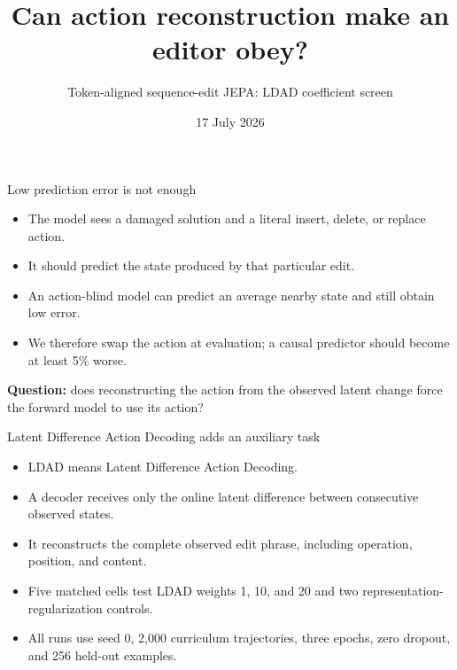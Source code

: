 \documentclass[aspectratio=169]{beamer}
\title{Can action reconstruction make an editor obey?}
\subtitle{Token-aligned sequence-edit JEPA: LDAD coefficient screen}
\date{17 July 2026}
\begin{document}
\frame{\titlepage}

\begin{frame}{Low prediction error is not enough}
  \begin{itemize}
    \item The model sees a damaged solution and a literal insert, delete, or replace action.
    \item It should predict the state produced by that particular edit.
    \item An action-blind model can predict an average nearby state and still obtain low error.
    \item We therefore swap the action at evaluation; a causal predictor should become at least 5\% worse.
  \end{itemize}
  \vfill
  \textbf{Question:} does reconstructing the action from the observed latent change force the forward model to use its action?
\end{frame}

\begin{frame}{Latent Difference Action Decoding adds an auxiliary task}
  \begin{itemize}
    \item LDAD means Latent Difference Action Decoding.
    \item A decoder receives only the online latent difference between consecutive observed states.
    \item It reconstructs the complete observed edit phrase, including operation, position, and content.
    \item Five matched cells test LDAD weights 1, 10, and 20 and two representation-regularization controls.
    \item All runs use seed 0, 2,000 curriculum trajectories, three epochs, zero dropout, and 256 held-out examples.
  \end{itemize}
\end{frame}
\end{document}
